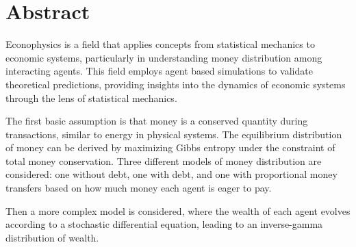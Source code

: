 
\section*{Abstract}

Econophysics is a field that applies concepts from statistical mechanics to economic systems, particularly in understanding money distribution among interacting agents. 
This field employs agent based simulations to validate theoretical predictions, providing insights into the dynamics of economic systems through the lens of statistical mechanics.

The first basic assumption is that money is a conserved quantity during transactions, similar to energy in physical systems.
The equilibrium distribution of money can be derived by maximizing Gibbs entropy under the constraint of total money conservation.
Three different models of money distribution are considered: one without debt, one with debt, and one with proportional money transfers based on how much money each agent is eager to pay.

Then a more complex model is considered, where the wealth of each agent evolves according to a stochastic differential equation, leading to an inverse-gamma distribution of wealth.


\newpage
